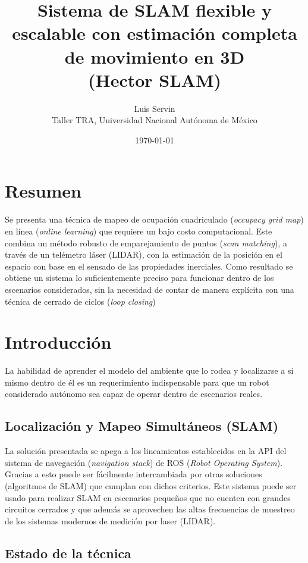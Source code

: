 \documentclass[10pt,a4paper]{article}
\title{\vspace{-6ex}Sistema de SLAM flexible y escalable con estimación completa de movimiento en 3D \\  \large{(Hector SLAM)}\vspace{-2ex}}
\date{\today}
\author{Luis Servin\\ Taller TRA, Universidad Nacional Autónoma de México}
\begin{document}
\maketitle

\section*{Resumen}

Se presenta una técnica de mapeo de ocupación cuadriculado (\emph{occupacy grid map}) en línea (\emph{online learning}) que requiere un bajo costo computacional. Este combina un método robusto de emparejamiento de puntos (\emph{scan matching}), a través de un telémetro láser (LIDAR), con la estimación de la posición en el espacio con base en el sensado de las propiedades inerciales. Como resultado se obtiene un sistema lo suficientemente preciso para funcionar dentro de los escenarios considerados, sin la necesidad de contar de manera explícita con una técnica de cerrado de ciclos (\emph{loop closing})

\section{Introducción}

La habilidad de aprender el modelo del ambiente que lo rodea y localizarse a si mismo dentro de él es un requerimiento indispensable para que un robot considerado autónomo sea capaz de operar dentro de escenarios reales.

\subsection*{Localización y Mapeo Simultáneos (SLAM)}

La solución presentada se apega a los lineamientos establecidos en la API del sistema de navegación (\emph{navigation stack}) de ROS (\emph{Robot Operating System}). Gracias a esto puede ser fácilmente intercambiada por otras soluciones (algoritmos de SLAM) que cumplan con dichos criterios. Este sistema puede ser usado para realizar SLAM en escenarios pequeños que no cuenten con grandes circuitos cerrados y que además se aprovechen las altas frecuencias de muestreo de los sistemas modernos de medición por laser (LIDAR).

\subsection*{Estado de la técnica}
\end{document}
